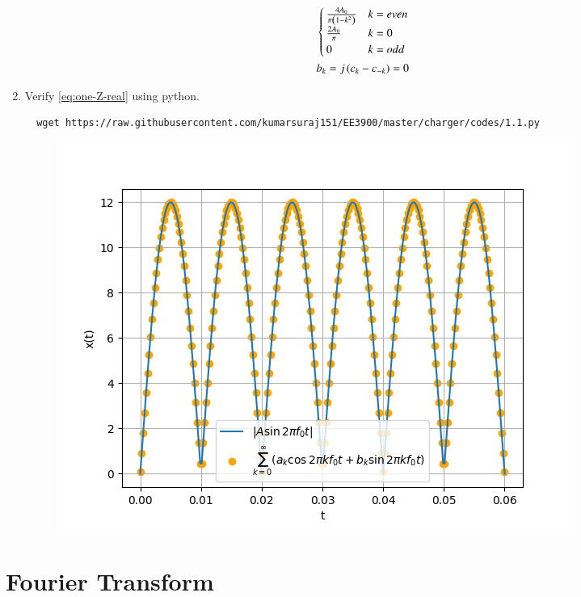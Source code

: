 \documentclass[journal,12pt,twocolumn]{IEEEtran}
\renewcommand\thesection{\arabic{section}}
\begin{document}
\begin{enumerate}[label=\thesection.\arabic*,ref=\thesection.\theenumi]
\begin{align}
\begin{cases}
\frac{4A_0}{\pi\left(1-k^2\right)}&k=even
\\
\frac{2A_0}{\pi}&k=0
\\
0&k=odd
\end{cases}\\
b_k=j\left(c_k-c_{-k}\right)=0
    \end{align}
\item Verify 
\eqref{eq:one-Z-real}
using python.\\
\solution 
  \begin{lstlisting}
  wget https://raw.githubusercontent.com/kumarsuraj151/EE3900/master/charger/codes/1.1.py
  \end{lstlisting}
    \begin{figure}[!ht]
\centering
\includegraphics[width=\columnwidth]{./figs/2.6}
\caption{}
\end{figure}

\end{enumerate}
\section{Fourier Transform}

 
\end{document}
